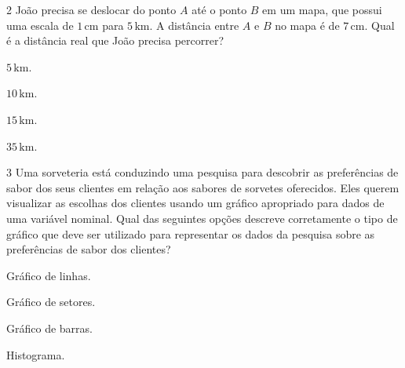 \num{2}  João precisa se deslocar do ponto $A$ até o ponto $B$ em um mapa, que
possui uma escala de $1\,\text{cm}$ para $5\,\text{km}$. A distância entre $A$ e $B$ no mapa é
de $7\,\text{cm}$. Qual é a distância real que João precisa percorrer?

\begin{escolha}
\item $5\,\text{km}$.
\item $10\,\text{km}$.
\item $15\,\text{km}$.
\item $35\,\text{km}$.
\end{escolha}




\num{3} Uma sorveteria está conduzindo uma pesquisa para descobrir as preferências
de sabor dos seus clientes em relação aos sabores de sorvetes oferecidos. Eles querem
visualizar as escolhas dos clientes usando um gráfico apropriado para dados de uma
variável nominal. Qual das seguintes opções descreve corretamente o tipo de gráfico
que deve ser utilizado para representar os dados da pesquisa sobre as preferências
de sabor dos clientes?

\begin{escolha}
\item Gráfico de linhas.

\item Gráfico de setores.

\item Gráfico de barras.

\item Histograma.
\end{escolha}

